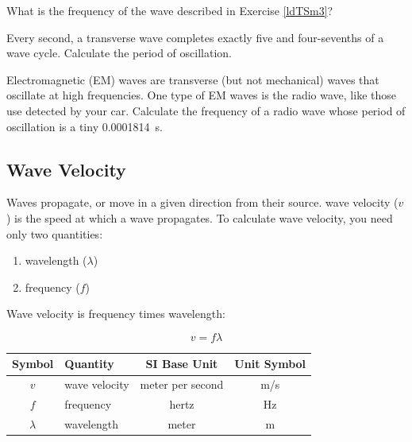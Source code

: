 \documentclass[main.tex]{subfiles}
\begin{document}
\begin{exercise} \label{3rLSIq}
    What is the frequency of the wave described in Exercise \ref{ldTSm3}?
\end{exercise}

\begin{exercise} \label{gz0LQL} 
    Every second, a transverse wave completes exactly five and four-sevenths of a wave cycle. Calculate the period of oscillation.
\end{exercise}

\begin{exercise} \label{MITNpN} 
    Electromagnetic (EM) waves are transverse (but not mechanical) waves that oscillate at high frequencies. One type of EM waves is the radio wave, like those use detected by your car. Calculate the frequency of a radio wave whose period of oscillation is a tiny \SI[group-separator={\,}]{0.0001814}{s}.
\end{exercise}

\cyanhrule

\subsection{Wave Velocity} \label{nkz8rf}
Waves \gls{propagate}, or move in a given direction from their source. \Gls{wave velocity} ($v$) is the speed at which a wave propagates. To calculate wave velocity, you need only two quantities:

\begin{enumerate}
\setlength\itemsep{0.1ex}
    \item wavelength ($\lambda$)
    \item frequency ($f$)
\end{enumerate}

Wave velocity is frequency times wavelength:

\begin{equation} \label{UeynWL}
    v = f \lambda
\end{equation}


\begin{center}
    \begin{tabular}{cl|cc}
    \hline
    \textbf{Symbol} & \textbf{Quantity} & \textbf{SI Base Unit} & \textbf{Unit Symbol}  \\
    \hline\hline
        $v$ & wave velocity & meter per second & \si{\meter/\second}\\
        $f$ & frequency & hertz & \si{\Hz}\\
        $\lambda$ & wavelength & meter & m\\
    \hline
    \end{tabular}
    \label{fig:Unit10_Table}
\end{center}
\end{document}
